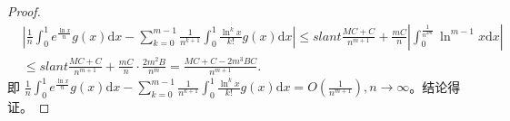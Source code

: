 \documentclass[../../main.tex]{subfiles}
\begin{document}
\begin{proof}
\begin{align*}
&\left|\frac{1}{n}\int_{0}^{1}e^{\frac{\ln x}{n}}g(x)\mathrm{d}x-\sum_{k = 0}^{m - 1}\frac{1}{n^{k + 1}}\int_{0}^{1}\frac{\ln^k x}{k!}g(x)\mathrm{d}x\right|
\leqslant slant\frac{MC + C}{n^{m + 1}}+\frac{mC}{n}\left|\int_{0}^{\frac{1}{n^{2m}}}\ln^{m - 1}x\mathrm{d}x\right|
\\
&\leqslant slant\frac{MC + C}{n^{m + 1}}+\frac{mC}{n}\cdot\frac{2m^2B}{n^m}
=\frac{MC + C-2m^3BC}{n^{m + 1}}.
\end{align*}
即 \(\frac{1}{n}\int_{0}^{1}e^{\frac{\ln x}{n}}g(x)\mathrm{d}x-\sum_{k = 0}^{m - 1}\frac{1}{n^{k + 1}}\int_{0}^{1}\frac{\ln^k x}{k!}g(x)\mathrm{d}x=O\left(\frac{1}{n^{m + 1}}\right),n\rightarrow\infty\)。结论得证。
\end{proof}
\end{document}
